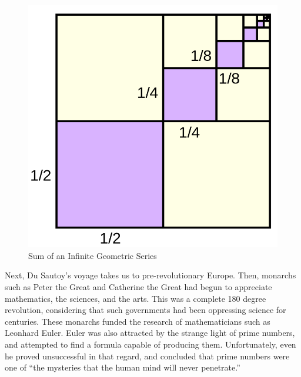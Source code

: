 \documentclass{mathbook}
\begin{document}
    \begin{figure}
        \centering
        \caption{Sum of an Infinite Geometric Series \cite{Matteo}}
        \label{fig:infinite-geometric-series}
        \includegraphics[scale=0.1]{images/infinite-geometric-series.png}
    \end{figure}

    Next, Du Sautoy's voyage takes us to pre-revolutionary Europe. Then, monarchs such as Peter the Great and Catherine the Great \cite{OldenbourgIdalie2020} had begun to appreciate mathematics, the sciences, and the arts. This was a complete 180 degree revolution, considering that such governments had been oppressing science for centuries. These monarchs funded the research of mathematicians such as Leonhard Euler. \cite[pp.~41-42]{Sautoy2003} Euler was also attracted by the strange light of prime numbers, and attempted to find a formula capable of producing them. Unfortunately, even he proved unsuccessful in that regard, and concluded that prime numbers were one of ``the mysteries that the human mind will never penetrate.'' \cite[p.~42]{Sautoy2003} \par
    
\end{document}
